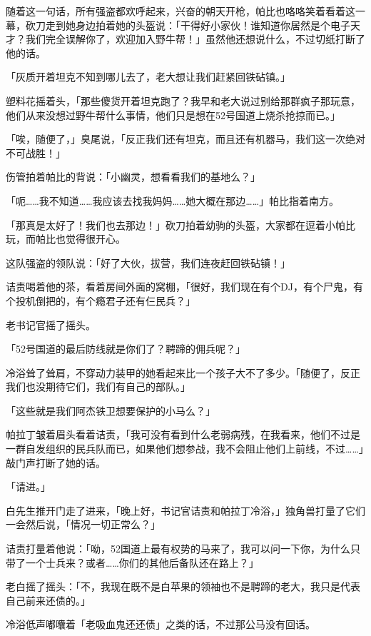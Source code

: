 随着这一句话，所有强盗都欢呼起来，兴奋的朝天开枪，帕比也咯咯笑着看着这一幕，砍刀走到她身边拍着她的头盔说：「干得好小家伙！谁知道你居然是个电子天才？我们完全误解你了，欢迎加入野牛帮！」虽然他还想说什么，不过切纸打断了他的话。

「灰质开着坦克不知到哪儿去了，老大想让我们赶紧回铁砧镇。」

塑料花摇着头，「那些傻货开着坦克跑了？我早和老大说过别给那群疯子那玩意，他们从来没想过野牛帮什么事情，他们只是想在52号国道上烧杀抢掠而已。」

「唉，随便了，」臭尾说，「反正我们还有坦克，而且还有机器马，我们这一次绝对不可战胜！」

伤管拍着帕比的背说：「小幽灵，想看看我们的基地么？」

「呃……我不知道……我应该去找我妈妈……她大概在那边……」帕比指着南方。

「那真是太好了！我们也去那边！」砍刀拍着幼驹的头盔，大家都在逗着小帕比玩，而帕比也觉得很开心。

这队强盗的领队说：「好了大伙，拔营，我们连夜赶回铁砧镇！」

\horizonline


诘责喝着他的茶，看着房间外面的窝棚，「很好，我们现在有个DJ，有个尸鬼，有个投机倒把的，有个瘾君子还有仨民兵？」

老书记官摇了摇头。

「52号国道的最后防线就是你们了？聘蹄的佣兵呢？」

冷浴耸了耸肩，不穿动力装甲的她看起来比一个孩子大不了多少。「随便了，反正我们也没期待它们，我们有自己的部队。」

「这些就是我们阿杰铁卫想要保护的小马么？」

帕拉丁皱着眉头看着诘责，「我可没有看到什么老弱病残，在我看来，他们不过是一群自发组织的民兵队而已，如果他们想参战，我不会阻止他们上前线，不过……」敲门声打断了她的话。

「请进。」

白先生推开门走了进来，「晚上好，书记官诘责和帕拉丁冷浴，」独角兽打量了它们一会然后说，「情况一切正常么？」

诘责打量着他说：「呦，52国道上最有权势的马来了，我可以问一下你，为什么只带了一个士兵来？或者……你们的其他后备队还在路上？」

老白摇了摇头：「不，我现在既不是白苹果的领袖也不是聘蹄的老大，我只是代表自己前来还债的。」

冷浴低声嘟囔着「老吸血鬼还还债」之类的话，不过那公马没有回话。

